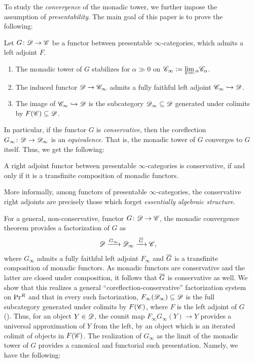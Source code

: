 \documentclass[english]{article}
\begin{document}
To study the \textit{convergence} of the monadic tower, we further impose the assumption of \textit{presentability}. The main goal of this paper is to prove the following:
\begin{thm*}
    Let $G\colon\mathscr{D} \to \mathscr{C}$ be a functor between presentable $\infty$-categories, which admits a left adjoint $F$.
    \begin{enumerate}
        \item The monadic tower of $G$ stabilizes for $\alpha\gg0$ on $\mathscr{C}_\infty := \underleftarrow{\operatorname{lim}\,}_\alpha \mathscr{C}_\alpha$.
        \item The induced functor 
            \(
                \mathscr{D} \to \mathscr{C}_\infty
            \)
            admits a fully faithful left adjoint $\mathscr{C}_\infty \hookrightarrow \mathscr{D}$.
        \item  The image of $\mathscr{C}_\infty \hookrightarrow \mathscr{D}$ is the subcategory $\mathscr{D}_\infty\subseteq \mathscr{D}$ generated under colimits by $F(\mathscr{C})\subseteq \mathscr{D}$. 
    \end{enumerate}
\end{thm*}

In particular, if the functor $G$ is \textit{conservative}, then the coreflection $G_\infty\colon\mathscr{D} \to \mathscr{D}_\infty$ is an \textit{equivalence}. That is, the monadic tower of $G$ converges to $G$ itself. Thus, we get the following:
\begin{corollary}
    A right adjoint functor between presentable $\infty$-categories is conservative, if and only if it is a transfinite composition of monadic functors.
\end{corollary}
More informally, among functors of presentable $\infty$-categories, the conservative right adjoints are precisely those which forget \textit{essentially algebraic structure}. 

For a general, non-conservative, functor $G\colon \mathscr{D} \to \mathscr{C}$, the monadic convergence theorem provides a factorization of $G$ as 
\[
    \mathscr{D} \xrightarrow{G_\infty} \mathscr{D}_\infty \xrightarrow{\:\overline{G}\:} \mathscr{C},
\]
where $G_\infty$ admits a fully faithful left adjoint $F_\infty$ and $\overline{G}$ is a transfinite composition of monadic functors. As monadic functors are conservative and the latter are closed under composition, it follows that $\overline{G}$ is conservative as well. We show that this realizes a general ``coreflection-conservative'' factorization system on $\mathrm{Pr}{}^R$ and that in every such factorization, $F_\infty(\mathscr{D}_\infty) \subseteq \mathscr{D}$ is the full subcategory generated under colimits by $F(\mathscr{C})$, where $F$ is the left adjoint of $G$ (). 
Thus, for an object $Y\in\mathscr{D}$, the counit map $F_\infty G_\infty (Y) \to Y$ provides a universal approximation of $Y$ from the left, by an object which is an iterated colimit of objects in $F(\mathscr{C})$. The realization of $G_\infty$ as the limit of the monadic tower of $G$ provides a canonical and functorial such presentation. Namely, we have the following:
\end{document}
